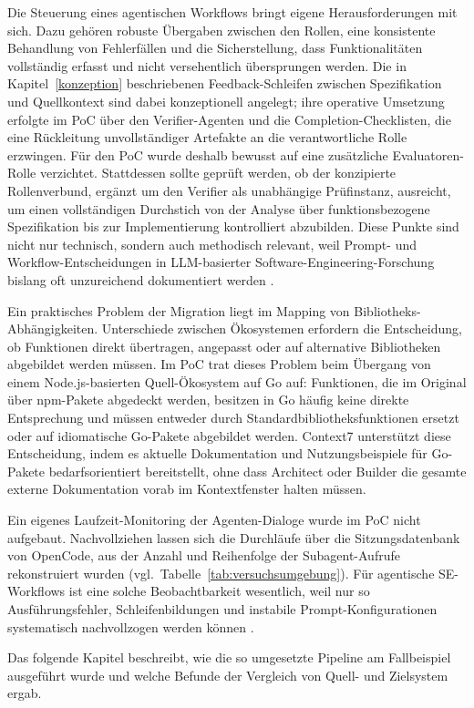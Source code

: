Die Steuerung eines agentischen Workflows bringt eigene Herausforderungen mit sich. Dazu gehören robuste Übergaben zwischen den Rollen, eine konsistente Behandlung von Fehlerfällen und die Sicherstellung, dass Funktionalitäten vollständig erfasst und nicht versehentlich übersprungen werden. Die in Kapitel~\ref{konzeption} beschriebenen Feedback-Schleifen zwischen Spezifikation und Quellkontext sind dabei konzeptionell angelegt; ihre operative Umsetzung erfolgte im PoC über den Verifier-Agenten und die Completion-Checklisten, die eine Rückleitung unvollständiger Artefakte an die verantwortliche Rolle erzwingen. Für den PoC wurde deshalb bewusst auf eine zusätzliche Evaluatoren-Rolle verzichtet. Stattdessen sollte geprüft werden, ob der konzipierte Rollenverbund, ergänzt um den Verifier als unabhängige Prüfinstanz, ausreicht, um einen vollständigen Durchstich von der Analyse über funktionsbezogene Spezifikation bis zur Implementierung kontrolliert abzubilden. Diese Punkte sind nicht nur technisch, sondern auch methodisch relevant, weil Prompt- und Workflow-Entscheidungen in LLM-basierter Software-Engineering-Forschung bislang oft unzureichend dokumentiert werden \parencite{korn2026reportingprompting}.

Ein praktisches Problem der Migration liegt im Mapping von Bibliotheks-Abhängigkeiten. Unterschiede zwischen Ökosystemen erfordern die Entscheidung, ob Funktionen direkt übertragen, angepasst oder auf alternative Bibliotheken abgebildet werden müssen. Im PoC trat dieses Problem beim Übergang von einem Node.js-basierten Quell-Ökosystem auf Go auf: Funktionen, die im Original über npm-Pakete abgedeckt werden, besitzen in Go häufig keine direkte Entsprechung und müssen entweder durch Standardbibliotheksfunktionen ersetzt oder auf idiomatische Go-Pakete abgebildet werden. Context7 unterstützt diese Entscheidung, indem es aktuelle Dokumentation und Nutzungsbeispiele für Go-Pakete bedarfsorientiert bereitstellt, ohne dass Architect oder Builder die gesamte externe Dokumentation vorab im Kontextfenster halten müssen.

Ein eigenes Laufzeit-Monitoring der Agenten-Dialoge wurde im PoC nicht aufgebaut. Nachvollziehen lassen sich die Durchläufe über die Sitzungsdatenbank von OpenCode, aus der Anzahl und Reihenfolge der Subagent-Aufrufe rekonstruiert wurden (vgl.\ Tabelle~\ref{tab:versuchsumgebung}). Für agentische SE-Workflows ist eine solche Beobachtbarkeit wesentlich, weil nur so Ausführungsfehler, Schleifenbildungen und instabile Prompt-Konfigurationen systematisch nachvollzogen werden können \parencite{yang2024sweagent}.

Das folgende Kapitel beschreibt, wie die so umgesetzte Pipeline am Fallbeispiel ausgeführt wurde und welche Befunde der Vergleich von Quell- und Zielsystem ergab.
